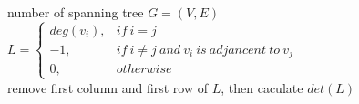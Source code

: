 number of spanning tree $G=(V, E)$\\
$
L=\left\{\begin{matrix}
    deg(v_{i}), &if\ i=j  \\ 
    -1, &if\ i \neq j\ and\ v_{i}\ is\ adjancent\ to\ v_{j}  \\
    0, &otherwise
\end{matrix}\right.
$\\
remove first column and first row of $L$, then caculate $det(L)$
